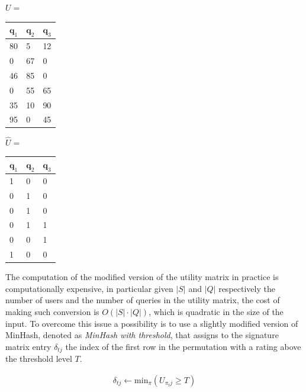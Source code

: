 \vspace{1em}
\begin{minipage}{0.5\linewidth}
    \centering
    $U=$
    \begin{tabular}{|l|l|l|}
    \hline
        \textbf{$\boldsymbol q_1$} & \textbf{$\boldsymbol q_2$} & \textbf{$\boldsymbol q_3$} \\ \hline
        80 & 5 & 12 \\ \hline
        0 & 67 & 0 \\ \hline
        46 & 85 & 0 \\ \hline
        0 & 55 & 65 \\ \hline
        35 & 10 & 90 \\ \hline
        95 & 0 & 45 \\ \hline
    \end{tabular}
\end{minipage}
\begin{minipage}{0.5\linewidth}
    $\widehat{U}=$
    \begin{tabular}{|l|l|l|}
    \hline
        \textbf{$\boldsymbol q_1$} & \textbf{$\boldsymbol q_2$} & \textbf{$\boldsymbol q_3$} \\ \hline
        1 & 0 & 0 \\ \hline
        0 & 1 & 0 \\ \hline
        0 & 1 & 0 \\ \hline
        0 & 1 & 1 \\ \hline
        0 & 0 & 1 \\ \hline
        1 & 0 & 0 \\ \hline
    \end{tabular}
\end{minipage}

\vspace{1em}

The computation of the modified version of the utility matrix in practice is computationally expensive, in particular given $|S|$ and $|Q|$ respectively the number of users and the number of queries in the utility matrix, the cost of making such conversion is $O(|S| \cdot |Q|)$, which is quadratic in the size of the input. To overcome this issue a possibility is to use a slightly modified version of MinHash, denoted as \emph{MinHash with threshold}, that assigns to the signature matrix entry $\delta_{tj}$ the index of the first row in the permutation with a rating above the threshold level $T$.

\begin{equation}
\begin{aligned}
\delta_{tj} \gets \text{min}_\pi (U_{\pi_tj} \geq T)
\end{aligned}
\end{equation}

